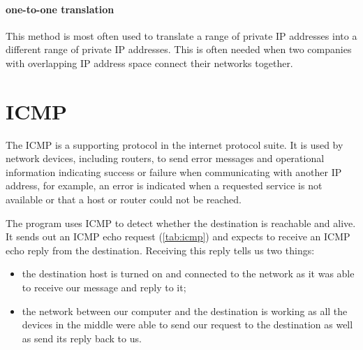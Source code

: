 \paragraph{one-to-one translation}
This method is most often used to translate a range of private \acs{IP} addresses into a different range of private \acs{IP} addresses.
This is often needed when two companies with overlapping \acs{IP} address space connect their networks together.

\section{\Acl{ICMP}}
\label{sec:ip-icmp}

The \acf{ICMP} is a supporting protocol in the internet protocol suite.
It is used by network devices, including routers, to send error messages and operational information indicating success or failure when communicating with another \acs{IP} address, for example, an error is indicated when a requested service is not available or that a host or router could not be reached.

The program  uses \acs{ICMP} to detect whether the destination is reachable and alive.
It sends out an \acs{ICMP} echo request (\cref{tab:icmp}) and expects to receive an \acs{ICMP} echo reply from the destination.
Receiving this reply tells us two things:
\begin{itemize}
\item
   the destination host is turned on and connected to the network as it was able to receive our message and reply to it;
\item
   the network between our computer and the destination is working as all the devices in the middle were able to send our request to the destination as well as send its reply back to us.
\end{itemize}


